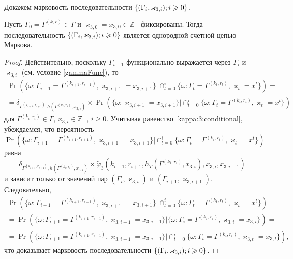 \documentclass[a4paper,12pt,russian]{extarticle}
\newcommand{\MarkThree}{\{(\Gamma_i, \varkappa_{3,i}); \hm{} i \geqslant 0\}}
\begin{document}
Докажем марковость последовательности $\MarkThree$.
\begin{theorem}
Пусть $\Gamma_0=\Gamma^{(k,r)}\in \Gamma$ и $\varkappa_{3,0}=x_{3,0}\in \mathbb{Z}_+$ фиксированы. Тогда последовательность $\MarkThree$ является однородной счетной цепью Маркова.
\end{theorem}
\begin{proof}
Действительно, поскольку $\Gamma_{i+1}$ функционально выражается через $\Gamma_i$ и $\varkappa_{3,i}$ (см. условие \eqref{gammaFunc}), то
\begin{multline*}
\Pr (\{ \omega\colon \Gamma_{i+1} =\Gamma^{(k_{i+1},r_{i+1})},\varkappa_{3,i+1} = x_{3,i+1}\} |\cap_{t=0}^{i}\{\omega\colon  \Gamma_t=\Gamma^{(k_t,r_t)}, \varkappa_t=x^t\})=\\
=\delta_{\Gamma^{(k_{i+1},r_{i+1})},h(\Gamma^{(k_i,r_i)},x_{3,i})}\times \Pr (\{ \omega\colon  \varkappa_{3,i+1} = x_{3,i+1}\} |\cap_{t=0}^{i}\{\omega\colon  \Gamma_t=\Gamma^{(k_t,r_t)}, \varkappa_t=x^t\})
\end{multline*}
для $\Gamma^{(k_i,r_i)}\in \Gamma$, $x_{3,i}\in {\mathbb Z}_+$, $i\geqslant 0$. Учитывая равенство \eqref{kappa:3:conditional}, убеждаемся, что вероятность 
$$
\Pr (\{\omega\colon  \Gamma_{i+1} =\Gamma^{(k_{i+1},r_{i+1})},\varkappa_{3,i+1} = x_{3,i+1}\} |\cap_{t=0}^{i}\{\omega\colon \Gamma_t=\Gamma^{(k_t,r_t)}, \varkappa_t=x^t\}) 
$$ 
равна
$$
\delta_{\Gamma^{(k_{i+1},r_{i+1})},h(\Gamma^{(k_i,r_i)},x_{3,i})} \times \widetilde{\varphi}_3(k_{i+1},r_{i+1},h_T(\Gamma^{(k_i,r_i)},x_{3,i}),x_{3,i},x_{3,i+1})
$$
и зависит только от значений пар $(\Gamma_i,\varkappa_{3,i})$ и $(\Gamma_{i+1},\varkappa_{3,i+1})$. Следовательно, 
\begin{multline*}
\Pr (\{ \omega\colon \Gamma_{i+1} =\Gamma^{(k_{i+1},r_{i+1})},\varkappa_{3,i+1} = x_{3,i+1}\} |\cap_{t=0}^{i}\{\omega\colon \Gamma_t=\Gamma^{(k_t,r_t)}, \varkappa_t=x^t\})=\\
=\Pr (\{\omega\colon   \Gamma_{i+1} =\Gamma^{(k_{i+1},r_{i+1})},\varkappa_{3,i+1} = x_{3,i+1}\} |\{\omega\colon  \Gamma_i=\Gamma^{(k_i,r_i)}, \varkappa_{3,i}=x_{3,i}\}) = \\
=\Pr (\{\omega\colon \Gamma_{i+1} =\Gamma^{(k_{i+1},r_{i+1})},\varkappa_{3,i+1} = x_{3,i+1}\} |\cap_{t=0}^{i}\{ \omega\colon \Gamma_t=\Gamma^{(k_t,r_t)}, \varkappa_{3,t}=x_{3,t}\}),
\end{multline*}
что доказывает марковость последовательности $\MarkThree$.
\end{proof}
\end{document}
